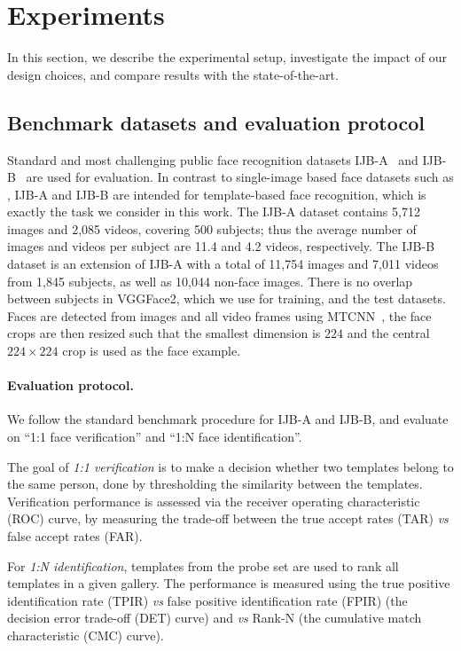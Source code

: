 \documentclass[runningheads]{llncs}
\newcommand{\vs}{\emph{vs }}
\begin{document}
%
\section{Experiments}
\label{sec:exp}
In this section, we describe the experimental setup,
investigate the impact of our design choices,
and compare results with the state-of-the-art.


\subsection{Benchmark datasets and evaluation protocol}
Standard and most challenging public face recognition datasets
IJB-A~\cite{Klare15} and IJB-B~\cite{Whitelam17}
are used for evaluation.
In contrast to single-image based face datasets such as
\cite{Parkhi15,Guo16,Kemelmacher16,Cao18},
IJB-A and IJB-B are intended for template-based face recognition,
which is exactly the task we consider in this work.
The IJB-A dataset contains 5,712 images 
and 2,085 videos, covering 500 subjects; thus the
average number of images and videos per subject
are 11.4 and 4.2 videos, respectively.
The IJB-B dataset is an extension of IJB-A
with a total of 11,754 images and
%
7,011 videos
from 1,845 subjects, as well as 
10,044 non-face images.
There is no overlap between subjects in VGGFace2, which we use
for training, and the test datasets.
Faces are detected from images and all video frames
using MTCNN~\cite{Zhang16},
the face crops are then resized such that the smallest 
dimension is $224$ and the central $224 \times 224$ crop is
used as the face example.


\paragraph{Evaluation protocol.}
We follow the standard benchmark procedure for
IJB-A and IJB-B, and evaluate on
``1:1 face verification'' and ``1:N face identification''.

The goal of \emph{1:1 verification} is to make a decision
whether two templates belong to the same person,
done by thresholding the similarity between the templates.
Verification performance is assessed via the
receiver operating characteristic (ROC) curve,
\ie by measuring the trade-off between the
true accept rates (TAR) \vs false accept 
rates (FAR).

For \emph{1:N identification},
templates from the probe set are used to rank
all templates in a given gallery. 
The performance is 
measured using the true positive identification 
rate (TPIR) \vs false positive identification 
rate (FPIR) (\ie the decision error trade-off (DET) curve)
and \vs Rank-N (\ie the cumulative match characteristic 
(CMC) curve).
\end{document}
